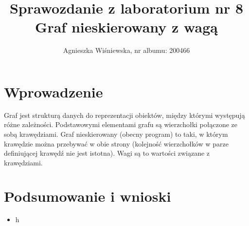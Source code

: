 \documentclass{mwart}
\title{\Huge{Sprawozdanie z laboratorium nr 8\\
Graf nieskierowany z wagą }}
\author{Agnieszka Wiśniewska, nr albumu: 200466}
\begin{document}
\maketitle

\section{Wprowadzenie}
Graf jest strukturą danych do reprezentacji obiektów, między którymi występują różne zależności. Podstawowymi elementami grafu są wierzchołki połączone ze sobą krawędziami. Graf nieskierowany (obecny program) to taki, w którym krawędzie można przebywać w obie strony (kolejność wierzchołków w parze definiującej krawędź nie jest istotna). Wagi są to wartości związane z krawędziami.

\newpage
\section{Podsumowanie i wnioski}
\begin{itemize}
\item h
\end{itemize}
\end{document}
